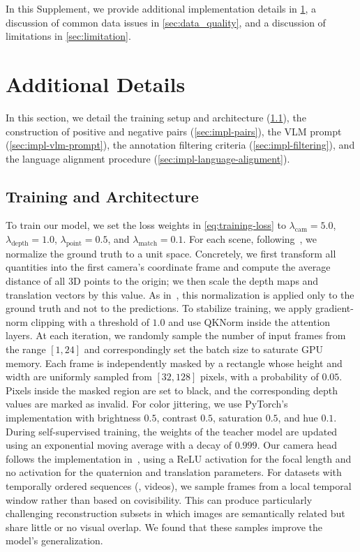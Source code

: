 \clearpage
\maketitlesupplementary
\appendix

In this Supplement, we provide additional implementation details in \cref{sec:impl}, a discussion of common data issues in \cref{sec:data_quality}, and a discussion of limitations in \cref{sec:limitation}.

\section{Additional Details}%
\label{sec:impl}

In this section, we detail the training setup and architecture (\cref{sec:impl-training}), the construction of positive and negative pairs (\cref{sec:impl-pairs}), the VLM prompt (\cref{sec:impl-vlm-prompt}), the annotation filtering criteria (\cref{sec:impl-filtering}), and the language alignment procedure (\cref{sec:impl-language-alignment}).

\subsection{Training and Architecture}%
\label{sec:impl-training}

To train our model, we set the loss weights in \cref{eq:training-loss} to $\lambda_{\text{cam}} = 5.0$, $\lambda_{\text{depth}} = 1.0$, $\lambda_{\text{point}} = 0.5$, and $\lambda_{\text{match}} = 0.1$.
For each scene, following~\cite{wang24dust3r:, wang25vggt}, we normalize the ground truth to a unit space.
Concretely, we first transform all quantities into the first camera's coordinate frame and compute the average distance of all 3D points to the origin; we then scale the depth maps and translation vectors by this value.
As in~\cite{wang25vggt}, this normalization is applied only to the ground truth and not to the predictions.
To stabilize training, we apply gradient-norm clipping with a threshold of $1.0$ and use QKNorm inside the attention layers.
At each iteration, we randomly sample the number of input frames from the range $[1, 24]$ and correspondingly set the batch size to saturate GPU memory.
Each frame is independently masked by a rectangle whose height and width are uniformly sampled from $[32, 128]$ pixels, with a probability of $0.05$.
Pixels inside the masked region are set to black, and the corresponding depth values are marked as invalid.
For color jittering, we use PyTorch's implementation with brightness $0.5$, contrast $0.5$, saturation $0.5$, and hue $0.1$.
During self-supervised training, the weights of the teacher model are updated using an exponential moving average with a decay of $0.999$.
Our camera head follows the implementation in~\cite{wang25vggt}, using a ReLU activation for the focal length and no activation for the quaternion and translation parameters.
For datasets with temporally ordered sequences (\eg, videos), we sample frames from a local temporal window rather than based on covisibility.
This can produce particularly challenging reconstruction subsets in which images are semantically related but share little or no visual overlap.
We found that these samples improve the model's generalization.

